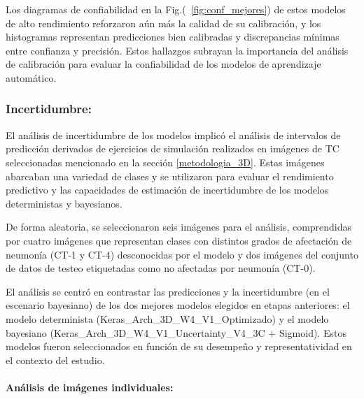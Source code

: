 \documentclass[10pt, oneside, a4paper]{article}
\begin{document}
	Los diagramas de confiabilidad en la Fig.(~\ref{fig:conf_mejores}) de estos modelos de alto rendimiento reforzaron aún más la calidad de su calibración, y los histogramas representan predicciones bien calibradas y discrepancias mínimas entre confianza y precisión. Estos hallazgos subrayan la importancia del análisis de calibración para evaluar la confiabilidad de los modelos de aprendizaje automático.

	\subsubsection{Incertidumbre:} \label{r_incertidumbre_3d}
	
	El análisis de incertidumbre de los modelos implicó el análisis de intervalos de predicción derivados de ejercicios de simulación realizados en imágenes de TC seleccionadas mencionado en la sección \ref{metodologia_3D}. Estas imágenes abarcaban una variedad de clases y se utilizaron para evaluar el rendimiento predictivo y las capacidades de estimación de incertidumbre de los modelos deterministas y bayesianos.
	
	De forma aleatoria, se seleccionaron seis imágenes para el análisis, comprendidas por cuatro imágenes que representan clases con distintos grados de afectación de neumonía (CT-1 y CT-4) desconocidas por el modelo y dos imágenes del conjunto de datos de testeo etiquetadas como no afectadas por neumonía (CT-0).
	
	El análisis se centró en contrastar las predicciones y la incertidumbre (en el escenario bayesiano) de los dos mejores modelos elegidos en etapas anteriores: el modelo determinista (Keras\_Arch\_3D\_W4\_V1\_Optimizado) y el modelo bayesiano (Keras\_Arch\_3D\_W4\_V1\_Uncertainty\_V4\_3C +  Sigmoid). Estos modelos fueron seleccionados en función de su desempeño y representatividad en el contexto del estudio.
	
	\paragraph{Análisis de imágenes individuales:}
	
\end{document}
